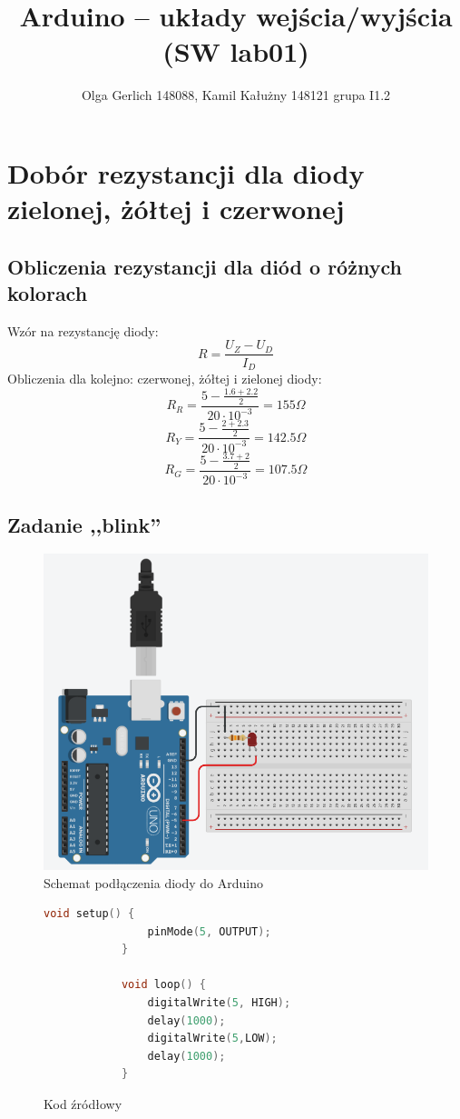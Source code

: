 \documentclass[polish,a4paper]{article}
\title{Arduino – układy wejścia/wyjścia (SW lab01)}
\author{Olga Gerlich 148088, Kamil Kałużny 148121 grupa I1.2}
\begin{document}
	\maketitle
	\section{Dobór rezystancji dla diody zielonej, żółtej i czerwonej}
	\subsection{Obliczenia rezystancji dla diód o różnych kolorach}
	Wzór na rezystancję diody:
	$$R = \frac{U_Z - U_D}{I_D}$$
	Obliczenia dla kolejno: czerwonej, żółtej i zielonej diody:
	$$R_R = \frac{5 - \frac{1.6 + 2.2}{2}}{20 \cdot 10^{-3}} = 155 \Omega$$
	$$R_Y = \frac{5 - \frac{2 + 2.3}{2}}{20 \cdot 10^{-3}} = 142.5 \Omega$$
	$$R_G = \frac{5 - \frac{3.7 + 2}{2}}{20 \cdot 10^{-3}} = 107.5 \Omega$$

	\subsection{Zadanie ,,blink''}
	\begin{figure}[h!]
		\begin{center}
			\includegraphics[scale=0.4]{01_blink.png}
			\caption*{Schemat podłączenia diody do Arduino}
		\end{center}
	\end{figure}
	\begin{figure}[h!]
		\begin{lstlisting}[language=C++]
			void setup() {
				pinMode(5, OUTPUT);
			}

			void loop() {
				digitalWrite(5, HIGH);
				delay(1000);
				digitalWrite(5,LOW);
				delay(1000);
			}
		\end{lstlisting}
		\caption*{Kod źródłowy}
	\end{figure}
\end{document}
